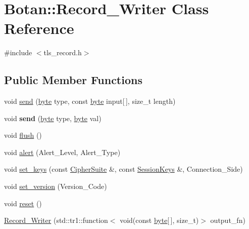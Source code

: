 \hypertarget{classBotan_1_1Record__Writer}{\section{Botan\-:\-:Record\-\_\-\-Writer Class Reference}
\label{classBotan_1_1Record__Writer}
}


{\ttfamily \#include $<$tls\-\_\-record.\-h$>$}

\subsection*{Public Member Functions}
\begin{DoxyCompactItemize}
\item 
void \hyperlink{classBotan_1_1Record__Writer_a0397074109aa9d57397373a3a9c4ab8b}{send} (\hyperlink{namespaceBotan_a7d793989d801281df48c6b19616b8b84}{byte} type, const \hyperlink{namespaceBotan_a7d793989d801281df48c6b19616b8b84}{byte} input\mbox{[}$\,$\mbox{]}, size\-\_\-t length)
\item 
\hypertarget{classBotan_1_1Record__Writer_a1d48181476d8ed0547603d52ee07c9d5}{void {\bfseries send} (\hyperlink{namespaceBotan_a7d793989d801281df48c6b19616b8b84}{byte} type, \hyperlink{namespaceBotan_a7d793989d801281df48c6b19616b8b84}{byte} val)}\label{classBotan_1_1Record__Writer_a1d48181476d8ed0547603d52ee07c9d5}

\item 
void \hyperlink{classBotan_1_1Record__Writer_a80240ff7098ab3c1df34048fcc41c018}{flush} ()
\item 
void \hyperlink{classBotan_1_1Record__Writer_ad0da616fe7c52dffbaad4119189a48f0}{alert} (Alert\-\_\-\-Level, Alert\-\_\-\-Type)
\item 
void \hyperlink{classBotan_1_1Record__Writer_a7dd736ea107775402a2f022fb67c38df}{set\-\_\-keys} (const \hyperlink{classBotan_1_1CipherSuite}{Cipher\-Suite} \&, const \hyperlink{classBotan_1_1SessionKeys}{Session\-Keys} \&, Connection\-\_\-\-Side)
\item 
void \hyperlink{classBotan_1_1Record__Writer_aef13abcc9222c543b73d4753366c8b03}{set\-\_\-version} (Version\-\_\-\-Code)
\item 
void \hyperlink{classBotan_1_1Record__Writer_a2e5eeb560e6350bc9481fe052165899c}{reset} ()
\item 
\hyperlink{classBotan_1_1Record__Writer_aa07b8f211aeefc9b86b14ea4c49d9ec0}{Record\-\_\-\-Writer} (std\-::tr1\-::function$<$ void(const \hyperlink{namespaceBotan_a7d793989d801281df48c6b19616b8b84}{byte}\mbox{[}$\,$\mbox{]}, size\-\_\-t)$>$ output\-\_\-fn)
\end{DoxyCompactItemize}


